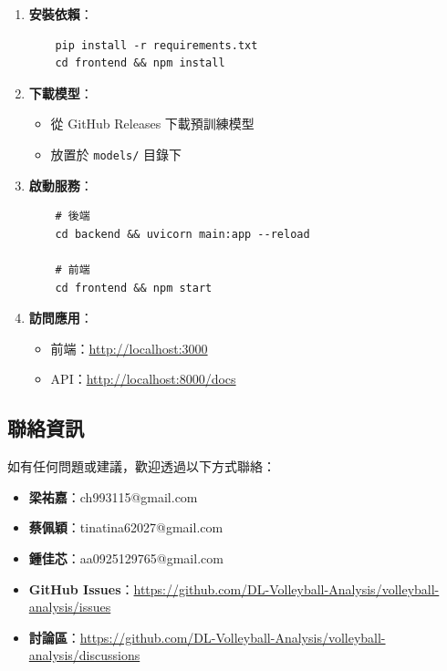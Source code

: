 \documentclass[a4paper,14pt,oneside]{article}
\begin{document}
\begin{enumerate}
    \item \textbf{安裝依賴}：
    \begin{verbatim}
    pip install -r requirements.txt
    cd frontend && npm install
    \end{verbatim}
    
    \item \textbf{下載模型}：
    \begin{itemize}
        \item 從 GitHub Releases 下載預訓練模型
        \item 放置於 \texttt{models/} 目錄下
    \end{itemize}
    
    \item \textbf{啟動服務}：
    \begin{verbatim}
    # 後端
    cd backend && uvicorn main:app --reload
    
    # 前端
    cd frontend && npm start
    \end{verbatim}
    
    \item \textbf{訪問應用}：
    \begin{itemize}
        \item 前端：\url{http://localhost:3000}
        \item API：\url{http://localhost:8000/docs}
    \end{itemize}
\end{enumerate}

\subsection*{聯絡資訊}

如有任何問題或建議，歡迎透過以下方式聯絡：

\begin{itemize}
    \item \textbf{梁祐嘉}：ch993115@gmail.com
    \item \textbf{蔡佩穎}：tinatina62027@gmail.com
    \item \textbf{鍾佳芯}：aa0925129765@gmail.com
    \item \textbf{GitHub Issues}：\url{https://github.com/DL-Volleyball-Analysis/volleyball-analysis/issues}
    \item \textbf{討論區}：\url{https://github.com/DL-Volleyball-Analysis/volleyball-analysis/discussions}
\end{itemize}

\end{document}
